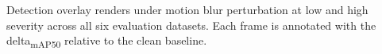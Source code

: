 \caption{Detection overlay renders under motion blur perturbation at low and high severity across all six evaluation datasets. Each frame is annotated with the delta\textsubscript{mAP50} relative to the clean baseline.}\label{fig:perturbation-plate-motion-blur}
